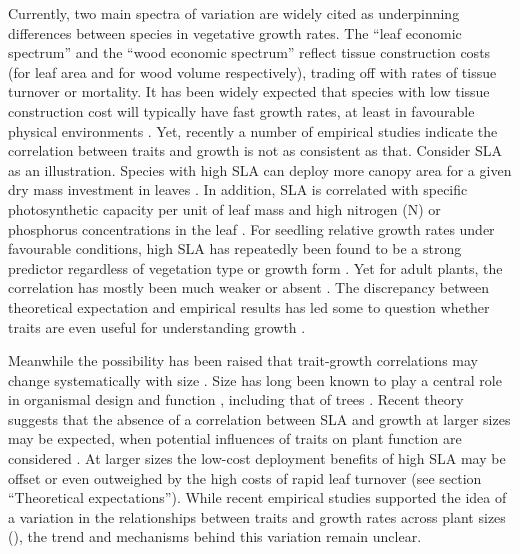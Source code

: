 \documentclass[a4paper,11pt]{article}
\begin{document}
Currently, two main spectra of variation are widely cited as underpinning differences between species in vegetative growth rates. The ``leaf economic spectrum'' \citep{Wright:2004jb} and the ``wood economic spectrum'' \citep{Chave:2009iy} reflect tissue construction costs (for leaf area and for wood volume respectively), trading off with rates of tissue turnover or mortality. It has been widely expected that species with low tissue construction cost will typically have fast growth rates, at least in favourable physical environments \citep[e.g.][]{MullerLandau:2004dc,Poorter:2008iu,Chave:2009iy,Larjavaara:2010bn,Iida:2012jb,Paine:2015df}. Yet, recently a number of empirical studies indicate the correlation between traits and growth is not as consistent as that. Consider SLA as an illustration. Species with high SLA can deploy more canopy area for a given dry mass investment in leaves \citep{Poorter:1999wd, Reich:1992wm}. In addition, SLA is correlated with specific photosynthetic capacity per unit of leaf mass and high nitrogen (N) or phosphorus concentrations in the leaf \citep{Wright:2004jb}. For seedling relative growth rates under favourable conditions, high SLA has repeatedly been found to be a strong predictor regardless of vegetation type or growth form \citep{Lambers:1992bj,Reich:1992wm,Grime:1997wm,Poorter:1999wd,Wright:1999ds}. Yet for adult plants, the correlation has mostly been much weaker or absent \citep{coomes_comparison_1998,Poorter:2008iu,Aiba:2009ft,Easdale:2009gv,Wright:2010tp}. The discrepancy between theoretical expectation and empirical results has led some to question whether traits are even useful for understanding growth \citep{Wright:2010tp, Paine:2015df}.

Meanwhile the possibility has been raised that trait-growth correlations may change systematically with size \citep{Falster:2011ii, Ruger:2012jv, Iida:2014ep, Iida:2014hq}. Size has long been known to play a central role in organismal design and function \citep{Vogel:1988ux, Vogel:2003wb}, including that of trees \citep{Farnsworth:1995im, Givnish:1995ta}. Recent theory suggests that the absence of a correlation between SLA and growth at larger sizes may be expected, when potential influences of traits on plant function are considered \citep{Falster:2011ii}. At larger sizes the low-cost deployment benefits of high SLA may be offset or even outweighed by the high costs of rapid leaf turnover (see section ``Theoretical expectations''). While recent empirical studies supported the idea of a variation in the relationships between traits and growth rates across plant sizes (\citealt{Iida:2014ep, Iida:2014hq}), the trend and mechanisms behind this variation remain unclear. 
\end{document}
